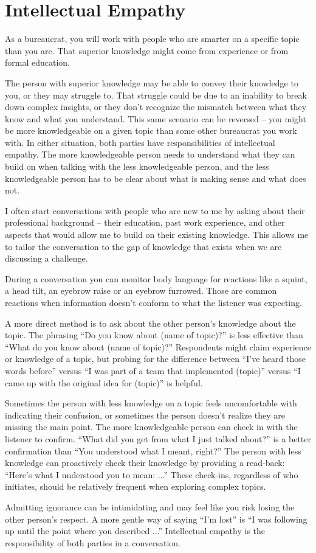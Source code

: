 \section{Intellectual Empathy}

As a bureaucrat, you will work with people who are smarter on a specific topic than you are. That superior knowledge might come from experience or from formal education. 

The person with superior knowledge may be able to convey their knowledge to you, or they may struggle to. That struggle could be due to an inability to break down complex insights, or they don't recognize the mismatch between what they know and what you understand. 
This same scenario can be reversed -- you might be more knowledgeable on a given topic than some other bureaucrat you work with. In either situation, both parties have responsibilities of intellectual empathy. The more knowledgeable person needs to understand what they can build on when talking with the less knowledgeable person, and the less knowledgeable person has to be clear about what is making sense and what does not. 

I often start conversations with people who are new to me by asking about their professional background -- their education, past work experience, and other aspects that would allow me to build on their existing knowledge. This allows me to tailor the conversation to the gap of knowledge that exists when we are discussing a challenge. 

During a conversation you can monitor body language for reactions like a squint, a head tilt, an eyebrow raise or an eyebrow furrowed. Those are common reactions when information doesn't conform to what the listener was expecting. 

A more direct method is to ask about the other person's knowledge about the topic. The phrasing ``Do you know about (name of topic)?'' is less effective than ``What do you know about (name of topic)?'' Respondents might claim experience or knowledge of a topic, but probing for the difference between ``I've heard those words before'' versus ``I was part of a team that implemented (topic)'' versus ``I came up with the original idea for (topic)'' is helpful. 

Sometimes the person with less knowledge on a topic feels uncomfortable with indicating their confusion, or sometimes the person doesn't realize they are missing the main point. The more knowledgeable person can check in with the listener to confirm. ``What did you get from what I just talked about?'' is a better confirmation than ``You understood what I meant, right?'' The person with less knowledge can proactively check their knowledge by providing a read-back: ``Here's what I understood you to mean: ...'' These check-ins, regardless of who initiates, should be relatively frequent when exploring complex topics. 

Admitting ignorance can be intimidating and may feel like you risk losing the other person's respect. A more gentle way of saying ``I'm lost'' is ``I was following up until the point where you described ...'' Intellectual empathy is the responsibility of both parties in a conversation. 